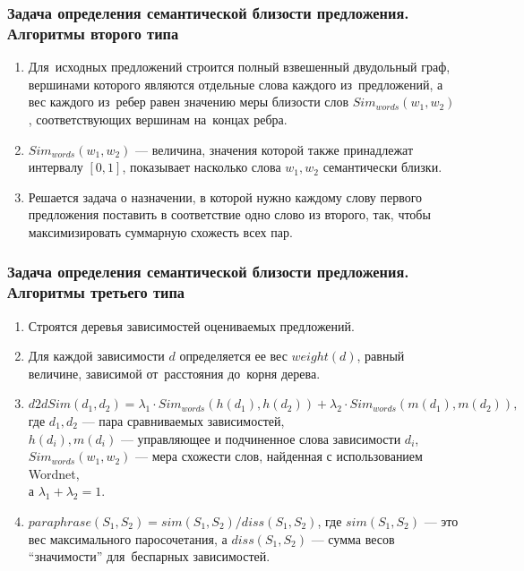 \documentclass{beamer}
\begin{document}
\begin{frame}
\frametitle{Задача определения семантической близости предложения. Алгоритмы второго типа}

\begin{enumerate}
\item{
Для~исходных предложений строится полный взвешенный двудольный граф, 
вершинами которого являются отдельные слова каждого из~предложений, 
а вес каждого из~ребер равен значению меры близости слов $Sim_{words}(w_1, w_2)$,
соответствующих вершинам на~концах ребра. 
}
\item{
$Sim_{words}(w_1, w_2)$ --- величина, значения которой также принадлежат интервалу $[0,1]$,
показывает насколько слова $w_1,w_2$ семантически близки.
}
\item{
Решается задача о назначении, в которой
нужно каждому слову первого предложения поставить в соответствие одно слово из второго,
так, чтобы максимизировать суммарную схожесть всех пар.
}
\end{enumerate}

\end{frame}

\begin{frame}
\frametitle{Задача определения семантической близости предложения. Алгоритмы третьего типа}

\begin{enumerate}

\item {
Строятся деревья зависимостей оцениваемых предложений.
}

\item {
Для каждой зависимости $d$ определяется ее  вес $weight(d)$, равный величине,  
зависимой от~расстояния до~корня дерева.
}

\item{
$d2dSim(d_1,d_2) = \lambda_1 \cdot Sim_{words}(h(d_1),h(d_2)) + \lambda_2 \cdot Sim_{words}(m(d_1),m(d_2)), $
где $d_1, d_2$ --- пара сравниваемых зависимостей,\\
$h(d_i), m(d_i)$ --- управляющее и подчиненное слова зависимости $d_i$,\\
$Sim_{words}(w_1,w_2)$ --- мера схожести слов, найденная с использованием Wordnet,\\
а $\lambda_1 + \lambda_2 = 1$.
}

\item{
$paraphrase(S_1, S_2) = sim(S_1,S_2)/diss(S_1, S_2)$, 
где $sim(S_1, S_2)$ --- это вес максимального паросочетания,
а $diss(S_1, S_2)$ --- сумма весов ``значимости'' для~беспарных зависимостей.
}
\end{enumerate}

\end{frame}
\end{document}
